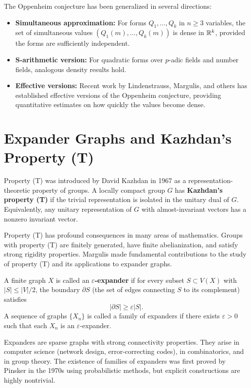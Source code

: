 The Oppenheim conjecture has been generalized in several directions:
\begin{itemize}
    \item \textbf{Simultaneous approximation:} For forms \(Q_1,\dots,Q_k\) in \(n \geq 3\) variables, the set of simultaneous values \((Q_1(m),\dots,Q_k(m))\) is dense in \(\mathbb{R}^k\), provided the forms are sufficiently independent.
    \item \textbf{S-arithmetic version:} For quadratic forms over \(p\)-adic fields and number fields, analogous density results hold.
    \item \textbf{Effective versions:} Recent work by Lindenstrauss, Margulis, and others has established effective versions of the Oppenheim conjecture, providing quantitative estimates on how quickly the values become dense.
\end{itemize}

\section{Expander Graphs and Kazhdan's Property (T)}

Property (T) was introduced by David Kazhdan in 1967 as a representation-theoretic property of groups. A locally compact group \(G\) has \textbf{Kazhdan's property (T)} if the trivial representation is isolated in the unitary dual of \(G\). Equivalently, any unitary representation of \(G\) with almost-invariant vectors has a nonzero invariant vector.

Property (T) has profound consequences in many areas of mathematics. Groups with property (T) are finitely generated, have finite abelianization, and satisfy strong rigidity properties. Margulis made fundamental contributions to the study of property (T) and its applications to expander graphs.

\begin{definition}
A finite graph \(X\) is called an \textbf{\(\varepsilon\)-expander} if for every subset \(S \subset V(X)\) with \(|S| \leq |V|/2\), the boundary \(\partial S\) (the set of edges connecting \(S\) to its complement) satisfies
\[
|\partial S| \geq \varepsilon |S|.
\]
A sequence of graphs \(\{X_n\}\) is called a family of expanders if there exists \(\varepsilon > 0\) such that each \(X_n\) is an \(\varepsilon\)-expander.
\end{definition}

Expanders are sparse graphs with strong connectivity properties. They arise in computer science (network design, error-correcting codes), in combinatorics, and in group theory. The existence of families of expanders was first proved by Pinsker in the 1970s using probabilistic methods, but explicit constructions are highly nontrivial.

